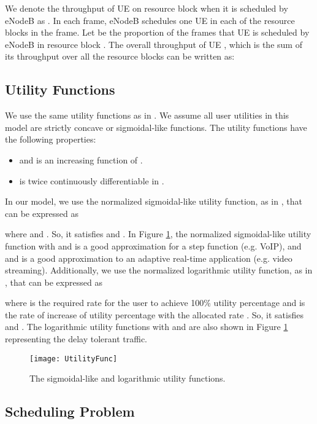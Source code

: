 \documentclass[conference]{IEEEtran}
\begin{document}
We denote the throughput of UE  on resource block  when it is scheduled by eNodeB  as . In each frame, eNodeB  schedules one UE in each of the resource blocks in the frame. Let  be the proportion of the frames that UE  is scheduled by eNodeB  in resource block . The overall throughput of UE , which is the sum of its throughput over all the resource blocks can be written as:



\subsection{Utility Functions}\label{sec:utilities}

We use the same utility functions as in \cite{Ahmed_Utility1}. We assume all user utilities  in this model are strictly concave or sigmoidal-like functions. The utility functions have the following properties: 
\begin{itemize}
\item  and  is an increasing function of .
\item  is twice continuously differentiable in .
\end{itemize}
In our model, we use the normalized sigmoidal-like utility function, as in \cite{DL_PowerAllocation}, that can be expressed as 

where  and . So, it satisfies  and . In Figure \ref{fig:SigLogUtility}, the normalized sigmoidal-like utility function with  and  is a good approximation for a step function (e.g. VoIP), and  and  is a good approximation to an adaptive real-time application (e.g. video streaming). Additionally, we use the normalized logarithmic utility function, as in \cite{UtilityFairness}, that can be expressed as 

where  is the required rate for the user to achieve 100\% utility percentage and  is the rate of increase of utility percentage with the allocated rate . So, it satisfies  and . The logarithmic utility functions with  and  are also shown in Figure \ref{fig:SigLogUtility} representing the delay tolerant traffic. 
 

\begin{figure}
    \centering
    \texttt{[image: UtilityFunc]}
    \caption{The sigmoidal-like and logarithmic utility functions.}
    \label{fig:SigLogUtility}
\end{figure} 

\subsection{Scheduling Problem}\label{sec:scheduling}
\end{document}
